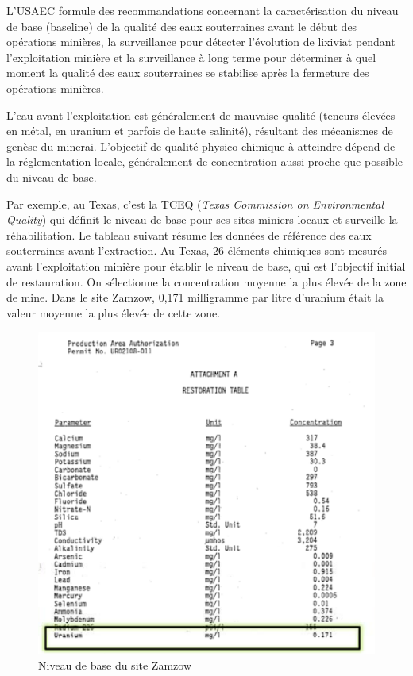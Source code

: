 \documentclass{article}
\begin{document}
L'USAEC formule des recommandations concernant la caractérisation du niveau de base (baseline) de la qualité des eaux souterraines avant le début des opérations minières, la surveillance pour détecter l’évolution de lixiviat pendant l'exploitation minière et la surveillance à long terme pour déterminer à quel moment la qualité des eaux souterraines se stabilise après la fermeture des opérations minières.

L'eau avant l'exploitation est généralement de mauvaise qualité (teneurs élevées en métal, en uranium et parfois de haute salinité), résultant des mécanismes de genèse du minerai. L'objectif de qualité physico-chimique à atteindre dépend de la réglementation locale, généralement de concentration aussi proche que possible du niveau de base.

Par exemple, au Texas, c’est la TCEQ (\textit{Texas Commission on Environmental Quality}) qui définit le niveau de base pour ses sites miniers locaux et surveille la réhabilitation. Le tableau suivant résume les données de référence des eaux souterraines avant l'extraction. Au Texas, 26 éléments chimiques sont mesurés avant l'exploitation minière pour établir le niveau de base, qui est l’objectif initial de restauration. On sélectionne la concentration moyenne la plus élevée de la zone de mine. Dans le site Zamzow, 0,171 milligramme par litre d'uranium était la valeur moyenne la plus élevée de cette zone.

\begin{figure}[H]
    \centering
    \includegraphics[width=0.8\linewidth]{II_C_2.png}
    \caption{Niveau de base du site Zamzow}
    \label{fig:site_zamzow_base}
\end{figure}
\end{document}
